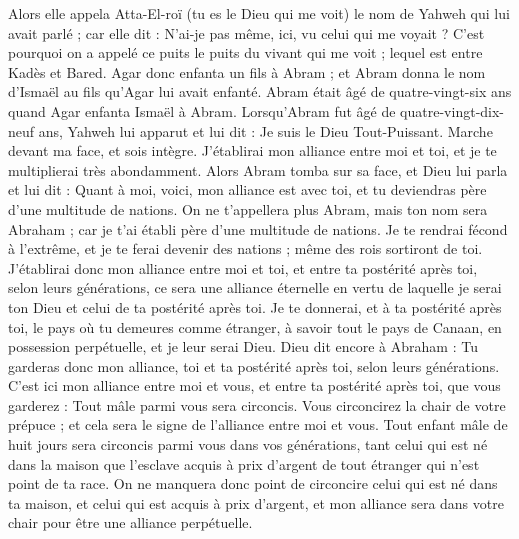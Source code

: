 \begin{multicols}{2}
Alors elle appela Atta-El-roï (tu es le Dieu qui me voit) le nom de Yahweh qui lui avait parlé ; car elle dit : N'ai-je pas même, ici, vu celui qui me voyait ?
C'est pourquoi on a appelé ce puits le puits du vivant qui me voit ; lequel est entre Kadès et Bared.
Agar donc enfanta un fils à Abram ; et Abram donna le nom d’Ismaël  au fils qu'Agar lui avait enfanté.
Abram était âgé de quatre-vingt-six ans quand Agar enfanta Ismaël à Abram.
\VerseOne{}Lorsqu’Abram fut âgé de quatre-vingt-dix-neuf ans, Yahweh lui apparut et lui dit : Je suis le Dieu Tout-Puissant. Marche devant ma face, et sois intègre.
J’établirai mon alliance entre moi et toi, et je te multiplierai très abondamment.
Alors Abram tomba sur sa face, et Dieu lui parla et lui dit :
Quant à moi, voici, mon alliance est avec toi, et tu deviendras père d'une multitude de nations.
On ne t’appellera plus Abram, mais ton nom sera Abraham ; car je t'ai établi père d'une multitude de nations.
Je te rendrai fécond  à l’extrême, et je te ferai devenir des nations ; même des rois sortiront de toi.
J'établirai donc mon alliance entre moi et toi, et entre ta postérité après toi, selon leurs générations, ce sera une alliance éternelle en vertu de laquelle je serai ton Dieu et celui de ta postérité après toi.
Je te donnerai, et à ta postérité après toi, le pays où tu demeures comme étranger, à savoir tout le pays de Canaan, en possession perpétuelle, et je leur serai Dieu.
Dieu dit encore à Abraham : Tu garderas donc mon alliance, toi et ta postérité après toi, selon leurs générations.
C’est ici mon alliance entre moi et vous, et entre ta postérité après toi, que vous garderez : Tout mâle parmi vous sera circoncis.
Vous circoncirez la chair de votre prépuce ; et cela sera le signe de l'alliance entre moi et vous.
Tout enfant mâle de huit jours sera circoncis parmi vous dans vos générations, tant celui qui est né dans la maison que l'esclave acquis à prix d’argent de tout étranger qui n'est point de ta race.
On ne manquera donc point de circoncire celui qui est né dans ta maison, et celui qui est acquis à prix d’argent, et mon alliance sera dans votre chair pour être une alliance perpétuelle.

\end{multicols}
